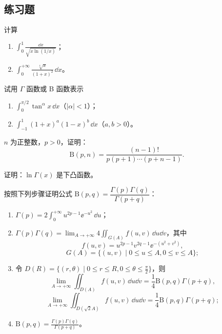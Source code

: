 \subsection{练习题}
\begin{xexercise}[1]
计算
  \begin{enumerate}[label=(\arabic*)]
    \item $\displaystyle\int_0^1\frac{\dd x}{\sqrt{x\ln(1/x)}}$；
    \item $\displaystyle\int_0^{+\infty}\frac{\sqrt[4]{x}}{(1+x)^2}\,\dd x$。
  \end{enumerate}
\end{xexercise}

\begin{xexercise}[2]
试用 $\Gamma$ 函数或 B 函数表示
  \begin{enumerate}[label=(\arabic*)]
    \item $\displaystyle\int_0^{\pi/2}\tan^\alpha x\,\dd x$（$|\alpha|<1$）；
    \item $\displaystyle\int_{-1}^1(1+x)^a(1-x)^b\,\dd x$（$a,b>0$）。
  \end{enumerate}
\end{xexercise}

\begin{xexercise}[3]
$n$ 为正整数，$p>0$，证明：
  \[
    \mathrm{B}(p,n)=\frac{(n-1)!}{p(p+1)\cdots(p+n-1)}.
  \]
\end{xexercise}

\begin{xexercise}[4]
证明：$\ln\Gamma(x)$ 是下凸函数。
\end{xexercise}

\begin{xexercise}[5]
按照下列步骤证明公式 $\mathrm{B}(p,q)=\dfrac{\Gamma(p)\Gamma(q)}{\Gamma(p+q)}$：
  \begin{enumerate}[label=(\arabic*)]
    \item $\displaystyle\Gamma(p)=2\int_0^{+\infty}u^{2p-1}\ee^{-u^2}\,\dd u$；
    \item $\displaystyle\Gamma(p)\Gamma(q)=\lim_{A\to+\infty}4\iint_{G(A)}f(u,v)\,\dd u\dd v$，其中
    \[
      f(u,v)=u^{2p-1}v^{2q-1}\ee^{-(u^2+v^2)},
    \]
    \[
      G(A)=\{(u,v)\mid0\leqslant u\leqslant A,0\leqslant v\leqslant A\};
    \]
    \item 令 $D(R)=\{(r,\theta)\mid0\leqslant r\leqslant R,0\leqslant\theta\leqslant\frac\pi2\}$，则
    \[
      \lim_{A\to+\infty}\iint_{D(A)}f(u,v)\,\dd u\dd v
      =\frac14\mathrm{B}(p,q)\Gamma(p+q),
    \]
    \[
      \lim_{A\to+\infty}\iint_{D(\sqrt2A)}f(u,v)\,\dd u\dd v
      =\frac14\mathrm{B}(p,q)\Gamma(p+q);
    \]
    \item $\displaystyle\mathrm{B}(p,q)=\frac{\Gamma(p)\Gamma(q)}{\Gamma(p+q)}$。
  \end{enumerate}
\end{xexercise}


